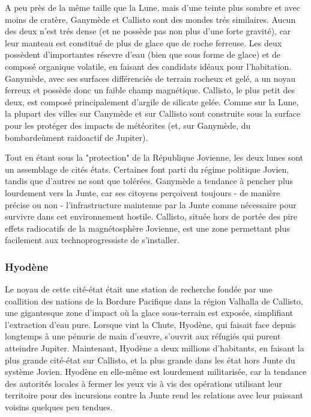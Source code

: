                                                                A peu près de la même taille que la Lune, mais d'une teinte plus sombre et avec moins de cratère, Ganymède et Callisto sont des mondes trés similaires. Aucun des deux n'est trés dense (et ne possède pas non plus d'une forte gravité), car leur manteau est constitué de plus de glace que de roche ferreuse. Les deux possèdent d'importantes résevre d'eau (bien que sous forme de glace) et de composé organique volatile, en faisant des candidats idéaux pour l'habitation. Ganymède, avec ses surfaces différenciés de terrain rocheux et gelé, a un noyau ferreux et possède donc un faible champ magnétique. Callisto, le plus petit des deux, est composé principalement d'argile de silicate gelée. Comme sur la Lune, la plupart des villes sur Canymède et sur Callisto sont construite sous la surface pour les protéger des impacts de météorites (et, sur Ganymède, du bombardeùment raidoactif de Jupiter). 

                                                               Tout en étant sous la "protection" de la République Jovienne, les deux lunes sont un assemblage de cités états. Certaines font parti du régime politique Jovien, tandis que d'autres ne sont que tolérées. Ganymède a tendance à pencher plus lourdement vers la Junte, car ses citoyens perçoivent toujours - de manière précise ou non - l'infrastructure maintenue par la Junte comme nécessaire pour survivre dans cet environnement hostile. Callisto, située hors de portée des pire effets radiocatifs de la magnétosphère Jovienne, est une zone permettant plus facilement aux technoprogressiste de s'installer. 

                                                               \subsubsection{Hyodène} \label{sec:hyoden} 

                                                               Le noyau de cette cité-état était une station de recherche fondée par une coallition des nations de la Bordure Pacifique dans la région Valhalla de Callisto, une gigantesque zone d'impact où la glace sous-terrain est exposée, simplifiant l'extraction d'eau pure. Lorsque vint la Chute, Hyodène, qui faisait face depuis longtemps à une pénurie de main d'œuvre, s'ouvrit aux réfugiés qui purent atteindre Jupiter. Maintenant, Hyodène a deux millions d'habitants, en faisant la plus grande cité-état sur Callisto, et la plus grande dans les état hors Junte du système Jovien. Hyodène en elle-même est lourdement militarisée, car la tendance des autorités locales à fermer les yeux vis à vis des opérations utilisant leur territoire pour des incursions contre la Junte rend les relations avec leur puissant voisins quelques peu tendues. 

